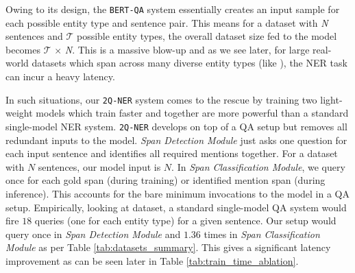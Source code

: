Owing to its design, the \texttt{BERT-QA} system essentially creates an input sample for each possible entity type and sentence pair. This means for a dataset with \textit{N} sentences and $\mathcal{T}$ possible entity types, the overall dataset size fed to the model becomes $\mathcal{T}$ $\times$ \textit{N}. This is a massive blow-up and as we see later, for large real-world datasets which span across many diverse entity types (like ), the NER task can incur a heavy latency.

In such situations, our \texttt{2Q-NER} system comes to the rescue by training two light-weight models which train faster and together are more powerful than a standard single-model NER system. \texttt{2Q-NER} develops on top of a QA setup but removes all redundant inputs to the model. \textit{Span Detection Module} just asks one question for each input sentence and identifies all required mentions together. For a dataset with $N$ sentences, our model input is $N$. In \textit{Span Classification Module}, we query once for each gold span (during training) or identified mention span (during inference). This accounts for the bare minimum invocations to the model in a QA setup. Empirically, looking at  dataset, a standard single-model QA system would fire $18$ queries (one for each entity type) for a given sentence. Our setup would query once in \textit{Span Detection Module} and $1.36$ times in \textit{Span Classification Module} as per Table \ref{tab:datasets_summary}. This gives a significant latency improvement as can be seen later in Table \ref{tab:train_time_ablation}. 
